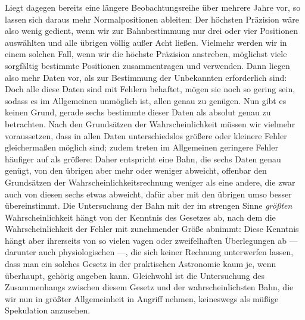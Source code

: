 Liegt dagegen bereits eine längere Beobachtungsreihe über mehrere Jahre vor, so lassen sich daraus mehr Normalpositionen ableiten: Der höchsten Präzision wäre also wenig gedient, wenn wir zur Bahnbestimmung nur drei oder vier Positionen auswählten und alle übrigen völlig außer Acht ließen. Vielmehr werden wir in einem solchen Fall, wenn wir die höchste Präzision anstreben, möglichst viele sorgfältig bestimmte Positionen zusammentragen und verwenden. Dann liegen also mehr Daten vor, als zur Bestimmung der Unbekannten erforderlich sind: Doch alle diese Daten sind mit Fehlern behaftet, mögen sie noch so gering sein, sodass es im Allgemeinen unmöglich ist, allen genau zu genügen. Nun gibt es keinen Grund, gerade sechs bestimmte dieser Daten als absolut genau zu betrachten. Nach den Grundsätzen der Wahrscheinlichkeit müssen wir vielmehr voraussetzen, dass in allen Daten unterschiedslos größere oder kleinere Fehler gleichermaßen möglich sind; zudem treten im Allgemeinen geringere Fehler häufiger auf als größere: Daher entspricht eine Bahn, die sechs Daten genau genügt, von den übrigen aber mehr oder weniger abweicht, offenbar den Grundsätzen der Wahrscheinlichkeitsrechnung weniger als eine andere, die zwar auch von diesen sechs etwas abweicht, dafür aber mit den übrigen umso besser übereinstimmt. Die Untersuchung der Bahn mit der im strengen Sinne \emph{größten} Wahrscheinlichkeit hängt von der Kenntnis des Gesetzes ab, nach dem die Wahrscheinlichkeit der Fehler mit zunehmender Größe abnimmt: Diese Kenntnis hängt aber ihrerseits von so vielen vagen oder zweifelhaften Überlegungen ab --- darunter auch physiologischen ---, die sich keiner Rechnung unterwerfen lassen, dass man ein solches Gesetz in der praktischen Astronomie kaum je, wenn überhaupt, gehörig angeben kann. Gleichwohl ist die Untersuchung des Zusammenhangs zwischen diesem Gesetz und der wahrscheinlichsten Bahn, die wir nun in größter Allgemeinheit in Angriff nehmen, keineswegs als müßige Spekulation anzusehen.
